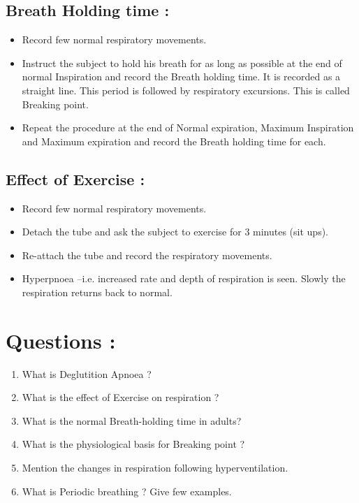 \documentclass[a4paper,12pt]{book}
\begin{document}
\subsection*{Breath Holding time :}
\begin{itemize}
\item{Record few normal respiratory movements.}
\item{Instruct the subject to hold his breath for as long as possible at the end of normal Inspiration and record the Breath holding time. It is recorded as a straight line. This period is followed by respiratory excursions. This is called Breaking point.}
\item{Repeat the procedure at the end of Normal expiration, Maximum Inspiration and Maximum expiration and record the Breath holding time for each.}
\end{itemize}

\subsection*{Effect of Exercise :}
\begin{itemize}
\item{Record few normal respiratory movements.}
\item{Detach the tube and ask the subject to exercise for 3 minutes (sit ups).}
\item{Re-attach the tube and record the respiratory movements.}
\item{Hyperpnoea –i.e. increased rate and depth of respiration is seen. Slowly the respiration returns back to normal.}
\end{itemize}

\section*{Questions :}
\begin{enumerate}
\item{What is Deglutition Apnoea ?}
\item{What is the effect of Exercise on respiration ?}
\item{What is the normal Breath-holding time in adults?}
\item{What is the physiological basis for Breaking point ?}
\item{Mention the changes in respiration following hyperventilation.}
\item{What is Periodic breathing ? Give few examples.}
\end{enumerate}
\end{document}
